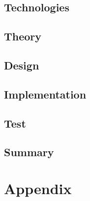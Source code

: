 




 
\tableofcontents








\chapter{Technologies}



\chapter{Theory}


\chapter{Design}

\chapter{Implementation}

\chapter{Test}




\chapter{Summary}




\printbibliography

\part{Appendix}
\appendix



 
